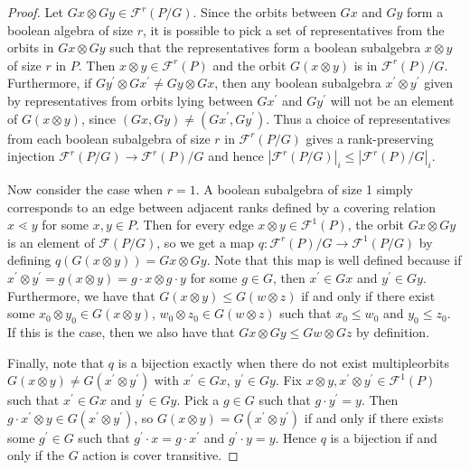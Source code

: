 \documentclass{amsart}
\theoremstyle{remark}
\begin{document}
\begin{proof}
Let $Gx\otimes Gy\in \mathcal{F}^r(P/G)$.  Since the orbits between $Gx$ and $Gy$ form a boolean algebra of size $r$, it is possible to pick a set of representatives from the orbits in $Gx\otimes Gy$ such that the representatives form a boolean subalgebra $x\otimes y$ of size $r$ in $P$.  Then $x\otimes y\in \mathcal{F}^r(P)$ and the orbit $G(x\otimes y)$ is in $\mathcal{F}^r(P)/G$.  Furthermore, if $Gy^\prime\otimes Gx^\prime \ne Gy\otimes Gx$, then any boolean subalgebra $x^\prime\otimes y^\prime$ given by representatives from orbits lying between $Gx^\prime$ and $Gy^\prime$ will not be an element of $G(x\otimes y)$, since $(Gx,Gy)\ne (Gx^\prime,Gy^\prime)$.  Thus a choice of representatives from each boolean subalgebra of size $r$ in $\mathcal{F}^r(P/G)$ gives a rank-preserving injection $\mathcal{F}^r(P/G)\rightarrow \mathcal{F}^r(P)/G$ and hence $|\mathcal{F}^r(P/G)|_i \le |\mathcal{F}^r(P)/G|_i$.

Now consider the case when $r = 1$.  A boolean subalgebra of size 1 simply corresponds to an edge between adjacent ranks defined by a covering relation $x\lessdot y$ for some $x,y\in P$.  Then for every edge $x\otimes y\in \mathcal{F}^1(P)$, the orbit $Gx\otimes Gy$ is an element of $\mathcal{F}(P/G)$, so we get a map $q\colon \mathcal{F}^r(P)/G \rightarrow \mathcal{F}^1(P/G)$ by defining $q(G(x\otimes y)) = Gx\otimes Gy$.  Note that this map is well defined because if $x^\prime\otimes y^\prime = g(x\otimes y) = g\cdot x\otimes g\cdot y$ for some $g\in G$, then $x^\prime\in Gx$ and $y^\prime\in Gy$.  Furthermore, we have that $G(x\otimes y) \le G(w\otimes z)$ if and only if there exist some $x_0\otimes y_0\in G(x\otimes y)$, $w_0\otimes z_0\in G(w\otimes z)$ such that $x_0\le w_0$ and $y_0\le z_0$.  If this is the case, then we also have that $Gx\otimes Gy \le Gw\otimes Gz$ by definition.

Finally, note that $q$ is a bijection exactly when there do not exist multipleorbits $G(x\otimes y) \ne G(x^\prime\otimes y^\prime)$ with $x^\prime\in Gx$, $y^\prime\in Gy$.  Fix $x\otimes y, x^\prime\otimes y^\prime\in \mathcal{F}^1(P)$ such that $x^\prime\in Gx$ and $y^\prime\in Gy$.  Pick a $g\in G$ such that $g\cdot y^\prime = y$.  Then $g\cdot x^\prime \otimes y\in G(x^\prime\otimes y^\prime)$, so $G(x\otimes y) = G(x^\prime \otimes y^\prime)$ if and only if there exists some $g^\prime\in G$ such that $g^\prime\cdot x = g\cdot x^\prime$ and $g^\prime\cdot y = y$. Hence $q$ is a bijection if and only if the $G$ action is cover transitive.
\end{proof}
\end{document}
